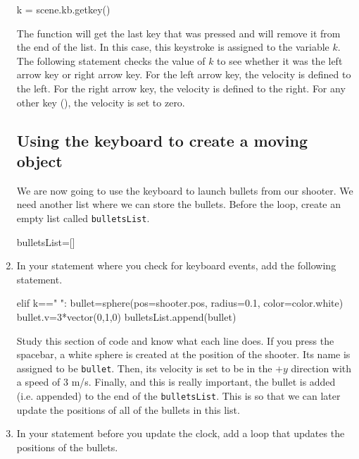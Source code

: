 \begin{enumerate}
\begin{myvpython}
            k = scene.kb.getkey()
\end{myvpython}

	The function  will get the last key that was pressed and will remove it from the end of the list. In this case, this keystroke is assigned to the variable $k$. The following  statement checks the value of $k$ to see whether it was the left arrow key or right arrow key. For the left arrow key, the velocity is defined to the left. For the right arrow key, the velocity is defined to the right. For any other key (), the velocity is set to zero.
	
	\subsection*{Using the keyboard to create a moving object}

We are now going to use the keyboard to launch bullets from our shooter. We need another list where we can store the bullets. Before the  loop, create an empty list called \texttt{bulletsList}.

\begin{myvpython}
bulletsList=[]
\end{myvpython}

	\item In your  statement where you check for keyboard events, add the following  statement.
	
\begin{myvpython}
            elif k==" ":
                bullet=sphere(pos=shooter.pos, radius=0.1, color=color.white)
                bullet.v=3*vector(0,1,0)
                bulletsList.append(bullet)
\end{myvpython}
            
            Study this section of code and know what each line does. If you press the spacebar, a white sphere is created at the position of the shooter. Its name is assigned to be \texttt{bullet}. Then, its velocity is set to be in the $+y$ direction with a speed of 3 m/s. Finally, and this is really important, the bullet is added (i.e. appended) to the end of the \texttt{bulletsList}. This is so that we can later update the positions of all of the bullets in this list.
            
            \item In your  statement before you update the clock, add a  loop that updates the positions of the bullets.
            

\end{enumerate}
